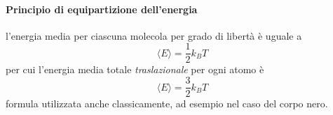 \paragraph{Principio di equipartizione dell'energia} l'energia media per ciascuna molecola per grado di libertà è uguale a
\begin{equation}
\langle E \rangle = \frac{1}{2} k_B T
\end{equation}
per cui l'energia media totale \textit{traslazionale} per ogni atomo è 
\begin{equation}
\langle E \rangle = \frac{3}{2} k_B T
\end{equation}
formula utilizzata anche classicamente, ad esempio nel caso del corpo nero.






